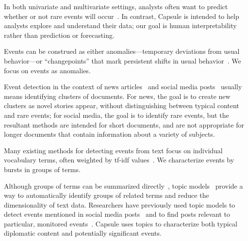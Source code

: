 In both univariate and multivariate settings, analysts often want to
predict whether or not rare events will
occur~\cite{weiss1998learning,das2008anomaly}. In contrast, Capsule is
intended to help analysts explore and understand their data; our goal
is human interpretability rather than prediction or forecasting.

Events can be construed as either anomalies---temporary deviations
from usual behavior---or ``changepoints'' that mark persistent shifts
in usual behavior~\cite{guralnik1999event,adams2007bayesian}. We focus
on events as anomalies.


Event detection in the context of news
articles~\cite{zhao2012novel,zhao2007temporal,zhang2002novelty,li2005probabilistic,wang2007mining,allan1998line}
and social media
posts~\cite{VanDam:2012,lau2012line,jackoway2011identification,sakaki2010earthquake,reuter2012event,becker2010learning,sayyadi2009event}
usually means identifying clusters of documents. For news, the goal is
to create new clusters as novel stories appear, without distinguishing
between typical content and rare events; for social media, the goal is
to identify rare events, but the resultant methods are intended for
short documents, and are not appropriate for longer documents that
contain information about a variety of subjects.

Many existing methods for detecting events from text focus on
individual vocabulary terms, often weighted by tf-idf
values~\cite{fung2005parameter,kumaran2004text,brants2003system,das2011dynamic,zhao2007temporal,zhao2012novel}.
We characterize events by bursts in groups of terms.

Although groups of terms can be summarized
directly~\cite{peng2007event,chakrabarti2011event,gao2012joint}, topic
models~\cite{Blei:2012} provide a way to automatically identify groups
of related terms and reduce the dimensionality of text
data. Researchers have previously used topic models to detect events
mentioned in social media posts~\cite{lau2012line,dou2012leadline} and
to find posts relevant to particular, monitored
events~\cite{VanDam:2012}. Capsule uses topics to characterize both
typical diplomatic content and potentially significant events.

